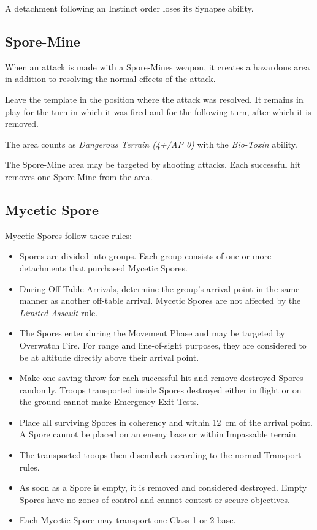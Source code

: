 A detachment following an Instinct order loses its Synapse ability.

\subsection{Spore-Mine}

When an attack is made with a Spore-Mines weapon, it creates a hazardous area in addition to resolving the normal effects of the attack.

Leave the template in the position where the attack was resolved. It remains in play for the turn in which it was fired and for the following turn, after which it is removed.

The area counts as \textit{Dangerous Terrain (4+/AP 0)} with the \textit{Bio-Toxin} ability.

The Spore-Mine area may be targeted by shooting attacks. Each successful hit removes one Spore-Mine from the area.

\subsection{Mycetic Spore}

Mycetic Spores follow these rules:

\begin{itemize}
    \item Spores are divided into groups. Each group consists of one or more detachments that purchased Mycetic Spores.

    \item During Off-Table Arrivals, determine the group's arrival point in the same manner as another off-table arrival. Mycetic Spores are not affected by the \textit{Limited Assault} rule.

    \item The Spores enter during the Movement Phase and may be targeted by Overwatch Fire. For range and line-of-sight purposes, they are considered to be at altitude directly above their arrival point.

    \item Make one saving throw for each successful hit and remove destroyed Spores randomly. Troops transported inside Spores destroyed either in flight or on the ground cannot make Emergency Exit Tests.

    \item Place all surviving Spores in coherency and within 12~cm of the arrival point. A Spore cannot be placed on an enemy base or within Impassable terrain.

    \item The transported troops then disembark according to the normal Transport rules.

    \item As soon as a Spore is empty, it is removed and considered destroyed. Empty Spores have no zones of control and cannot contest or secure objectives.

    \item Each Mycetic Spore may transport one Class 1 or 2 base.
\end{itemize}

